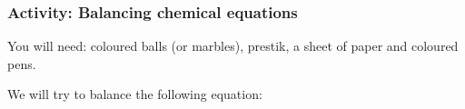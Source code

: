             \subsubsection{ Activity: Balancing chemical equations}
            \nopagebreak
            \label{m38726*eip-695}You will need: coloured balls (or marbles), prestik, a sheet of paper and coloured pens.
\par 
\label{m38726*eip-69823}We will try to balance the following equation:
\label{m38726*eid0342}\nopagebreak\noindent{}
    
